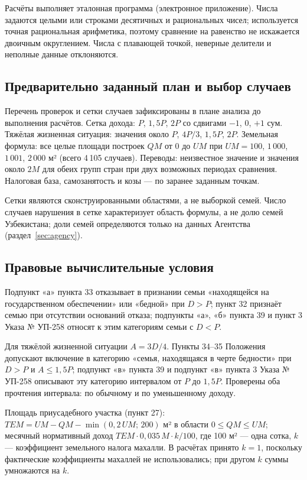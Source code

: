 \documentclass[12pt,a4paper]{extarticle}
\begin{document}
Расчёты выполняет эталонная программа (электронное приложение). Числа задаются целыми или строками десятичных и рациональных чисел; используется точная рациональная арифметика, поэтому сравнение на равенство не искажается двоичным округлением. Числа с плавающей точкой, неверные делители и неполные данные отклоняются.

\subsection{Предварительно заданный план и выбор случаев}
Перечень проверок и сетки случаев зафиксированы в плане анализа до выполнения расчётов. Сетка дохода: $P$, $1{,}5P$, $2P$ со сдвигами $-1$, $0$, $+1$ сум. Тяжёлая жизненная ситуация: значения около $P$, $4P/3$, $1{,}5P$, $2P$. Земельная формула: все целые площади построек $QM$ от $0$ до $UM$ при $UM=100$, $1\,000$, $1\,001$, $2\,000$ м² (всего 4\,105 случаев). Переводы: неизвестное значение и значения около $2M$ для обеих групп стран при двух возможных периодах сравнения. Налоговая база, самозанятость и козы — по заранее заданным точкам.

Сетки являются сконструированными областями, а не выборкой семей. Число случаев нарушения в сетке характеризует область формулы, а не долю семей Узбекистана; доли семей определяются только на данных Агентства (раздел~\ref{sec:agency}).

\subsection{Правовые вычислительные условия}
Подпункт «а» пункта 33 отказывает в признании семьи «находящейся на государственном обеспечении» или «бедной» при $D>P$; пункт 32 признаёт семью при отсутствии оснований отказа; подпункты «а», «б» пункта 39 и пункт 3 Указа № УП-258 относят к этим категориям семьи с $D<P$\cite{ref2,ref3}.

Для тяжёлой жизненной ситуации $A=3D/4$. Пункты 34–35 Положения допускают включение в категорию «семья, находящаяся в черте бедности» при $D>P$ и $A\le1{,}5P$; подпункт «в» пункта 39 и подпункт «в» пункта 3 Указа № УП-258 описывают эту категорию интервалом от $P$ до $1{,}5P$. Проверены оба прочтения интервала: по обычному и по уменьшенному доходу.

Площадь приусадебного участка (пункт 27): $TEM=UM-QM-\min(0{,}2\,UM;\,200)$ м² в области $0\le QM\le UM$; месячный нормативный доход $TEM\cdot0{,}035\,M\cdot k/100$, где 100 м² — одна сотка, $k$ — коэффициент земельного налога махалли. В расчётах принято $k=1$, поскольку фактические коэффициенты махаллей не использовались; при другом $k$ суммы умножаются на $k$.
\end{document}
